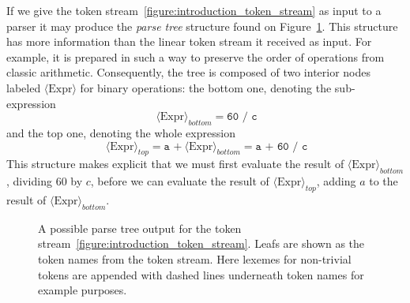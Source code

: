 \documentclass[
  oneside,
  english,
  coorientadorbanca,
  embeddedlogo,
  noabntexcite
]{ufsc-thesis-rn46-2019}
\newcommand{\bnfvar}[1]{\ \bnfvars{#1}}
\newcommand{\bnfvars}[1]{\langle\textrm{#1}\rangle}
\begin{document}
If we give the token stream~\eqref{figure:introduction_token_stream} as input to a parser it may produce the \textit{parse tree} structure found on Figure~\ref{figure:introduction_ast}.
This structure has more information than the linear token stream it received as input.
For example, it is prepared in such a way to preserve the order of operations from classic arithmetic.
Consequently, the tree is composed of two interior nodes labeled $\bnfvars{Expr}$ for binary operations: the bottom one, denoting the sub-expression
\begin{equation*}
  \bnfvar{Expr}_{bottom} = \texttt{60 / c}
\end{equation*}
and the top one, denoting the whole expression
\begin{equation*}
  \bnfvar{Expr}_{top} = \texttt{a +} \bnfvar{Expr}_{bottom} = \texttt{a + 60 / c}
\end{equation*}
This structure makes explicit that we must first evaluate the result of $\bnfvars{Expr}_{bottom}$, dividing $60$ by $c$, before we can evaluate the result of $\bnfvars{Expr}_{top}$, adding $a$ to the result of $\bnfvars{Expr}_{bottom}$.

\begin{figure}[ht]
  \centering
  \caption{
    A possible parse tree output for the token stream~\eqref{figure:introduction_token_stream}.
    Leafs are shown as the token names from the token stream.
    Here lexemes for non-trivial tokens are appended with dashed lines underneath token names for example purposes.
  }\label{figure:introduction_ast}
\end{figure}
\end{document}
